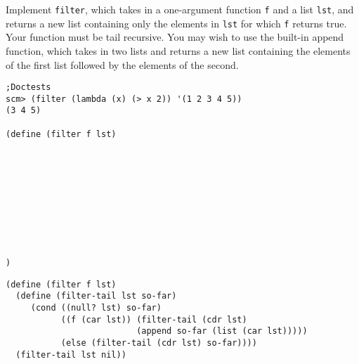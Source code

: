 \begin{blocksection}

\question Implement \texttt{filter}, which takes in a one-argument function \texttt{f} and 
a list \texttt{lst}, and returns a new list containing only the elements in \texttt{lst} 
for which \texttt{f} returns true. Your function must be tail recursive.
\newline
You may wish to use the built-in append function, which takes in two lists and returns a 
new list containing the elements of the first list followed by the elements of the second.

\begin{lstlisting}
;Doctests
scm> (filter (lambda (x) (> x 2)) '(1 2 3 4 5))
(3 4 5)

(define (filter f lst)










)
\end{lstlisting}

\begin{solution}[0.5in]
\begin{lstlisting}
(define (filter f lst)
  (define (filter-tail lst so-far)
     (cond ((null? lst) so-far)
           ((f (car lst)) (filter-tail (cdr lst) 
                          (append so-far (list (car lst)))))
           (else (filter-tail (cdr lst) so-far))))
  (filter-tail lst nil))
\end{lstlisting}
\end{solution}

\end{blocksection}